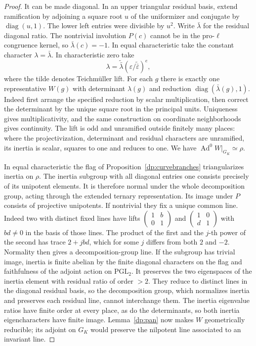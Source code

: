 \begin{proof}
It can be made diagonal. In an upper triangular residual basis,
extend ramification by adjoining a square root \(u\) of the
uniformizer and conjugate by \(\operatorname{diag}(u,1)\).
The lower left entries were divisible by \(u^2\). Write
\(\bar\lambda\) for the residual diagonal ratio. The nontrivial
involution \(P(c)\) cannot be in the pro-\(\ell\) congruence
kernel, so \(\bar\lambda(c)=-1\). In equal characteristic take the
constant character \(\lambda=\bar\lambda\). In characteristic zero
take
\[
 \lambda=\widetilde{\bar\lambda}
                 (\varepsilon/\widetilde{\bar\varepsilon})^e,
\]
where the tilde denotes Teichm\"uller lift. For each \(g\) there is
exactly one representative \(W(g)\) with determinant \(\lambda(g)\)
and reduction \(\operatorname{diag}(\bar\lambda(g),1)\). Indeed
first arrange the specified reduction by scalar multiplication,
then correct the determinant by the unique square root in the
principal units. Uniqueness gives multiplicativity, and the same
construction on coordinate neighborhoods gives continuity. The lift
is odd and unramified outside finitely many places: where the
projectivization, determinant and residual characters are
unramified, its inertia is scalar, squares to one and reduces to
one. We have \(\operatorname{Ad}^0W|_{G_K}\simeq\rho\).

In equal characteristic the flag of Proposition~\ref{dp:curvebranches}
triangularizes inertia on \(\rho\). The inertia subgroup with all
diagonal entries one consists precisely of its unipotent elements.
It is therefore normal under the whole decomposition group, acting
through the extended ternary representation. Its image under \(P\)
consists of projective unipotents. If nontrivial they fix a unique
common line. Indeed two with distinct fixed lines have lifts
\(\left(\begin{smallmatrix}1&b\\0&1\end{smallmatrix}\right)\) and
\(\left(\begin{smallmatrix}1&0\\d&1\end{smallmatrix}\right)\)
with \(bd\ne0\) in the basis of those lines. The product of the
first and the \(j\)-th power of the second has trace \(2+jbd\),
which for some \(j\) differs from both \(2\) and \(-2\).
Normality then gives a decomposition-group line. If the subgroup
has trivial image, inertia is finite abelian by the finite
diagonal characters on the flag and faithfulness of the adjoint
action on \(\mathrm{PGL}_2\). It preserves the two eigenspaces of
the inertia element with residual ratio of order \(>2\). They
reduce to distinct lines in the diagonal residual basis, so the
decomposition group, which normalizes inertia and preserves each
residual line, cannot interchange them. The inertia eigenvalue
ratios have finite order at every place, as do the determinants,
so both inertia eigencharacters have finite image. Lemma~\ref{dp:pan}
now makes \(W\) geometrically reducible; its adjoint on \(G_K\)
would preserve the nilpotent line associated to an invariant line.


\end{proof}
